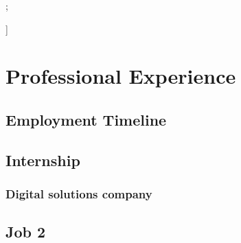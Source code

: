 \documentclass[a4paper,9pt]{article}
\newcommand{\coloritem}[2]{
    \item[{\color{#1}$\bullet$}] #2
}
\begin{document}
\begin{tcolorbox}
{{\vspace{-1.2mm}
%

  };}]


\section*{Professional Experience}
\vspace{-2.0mm}
{\color{blue}\subsection*{Employment Timeline}}

\subsection*{Internship}
\vspace{-1.2mm}
\subsubsection*{Digital solutions company}
\lipsum[1]
\vspace{-3.2mm}
\subsection*{Job 2}
\vspace{-1.2mm}
\lipsum[1]


\end{tcolorbox}
\end{document}
